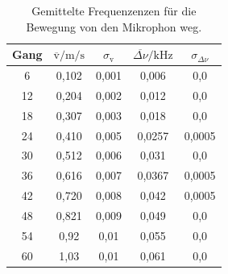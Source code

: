 \begin{table}
  \centering
  \caption{Gemittelte Frequenzenzen für die Bewegung von den Mikrophon weg.}
  \label{tab:schwebung}
  \begin{tabular}{c c c c c}
    \toprule
Gang &  $\overline{\text{v}}/\si{\meter\per\second}$ & $\sigma_{\text{v}}$
 & $\overline{\Delta\nu}/\si{\kilo\hertz}$ & $\sigma_{\Delta\nu}$\\
    \midrule
    6  & 0,102 & 0,001 & 0,006  &0,0\\
    12 & 0,204 & 0,002 & 0,012  &0,0\\
    18 & 0,307 & 0,003 & 0,018  &0,0\\
    24 & 0,410 & 0,005 & 0,0257 &0,0005\\
    30 & 0,512 & 0,006 & 0,031  &0,0\\
    36 & 0,616 & 0,007 & 0,0367 &0,0005\\
    42 & 0,720 & 0,008 & 0,042  &0,0005\\
    48 & 0,821 & 0,009 & 0,049  &0,0\\
    54 & 0,92  & 0,01  & 0,055  &0,0\\
    60 & 1,03  & 0,01  & 0,061  &0,0\\
    \bottomrule
  \end{tabular}
\end{table}
